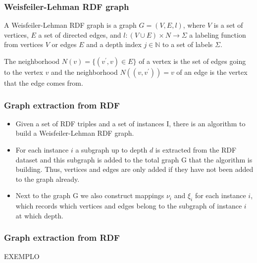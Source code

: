\documentclass{beamer}
\begin{document}

\begin{frame}
\frametitle{Weisfeiler-Lehman RDF graph}

\begin{definition}
A Weisfeiler-Lehman RDF graph is a graph $G = (V, E, l)$, where $V$ is a set of vertices, $E$ a set of directed edges, and $l:(V \cup E) \times N \rightarrow \Sigma$ a labeling function from vertices $V$ or edges $E$ and a depth index $j \in \mathbb{N}$ to a set of labels $\Sigma$.
\end{definition}

\begin{definition}[Neighborhood]
The neighborhood $N(v) = \{(v^\prime, v) \in E\}$ of a vertex is the set of edges going to the vertex $v$ and the neighborhood $N((v, v^\prime)) = {v}$ of an edge is the vertex that the edge comes from.
\end{definition}

\end{frame}



\begin{frame}
\frametitle{Graph extraction from RDF}

\begin{itemize}
\item
Given a set of RDF triples and a set of instances I, there is an algorithm to build a Weisfeiler-Lehman RDF graph.

\item
For each instance $i$ a subgraph up to depth $d$ is extracted from the RDF dataset and this subgraph is added to the total graph G that the algorithm is building. Thus, vertices and edges are only added if they have not been added to the graph already.

\item
Next to the graph G we also construct mappings $\nu_i$ and $\xi_i$ for each instance $i$, which records which vertices and edges belong to the subgraph of instance $i$ at which depth.
\end{itemize}

\end{frame}


\begin{frame}
\frametitle{Graph extraction from RDF}

EXEMPLO

\end{frame}
\end{document}
